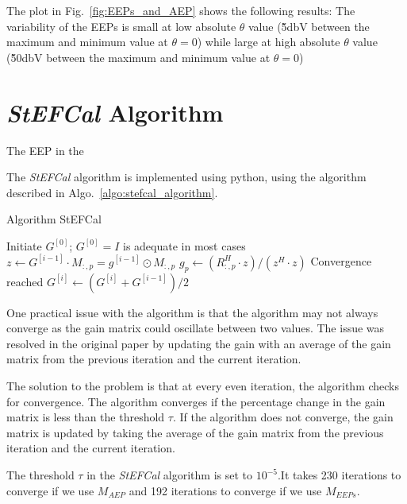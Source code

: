 \documentclass[10pt,a4paper,twocolumn]{paper}
\begin{document}
The plot in Fig.~\ref{fig:EEPs_and_AEP} shows the following results: The variability of the EEPs is small at low absolute $\theta$ value (\~5dbV between the maximum and minimum value at $\theta = 0$) while large at high absolute $\theta$ value (\~50dbV between the maximum and minimum value at $\theta = 0$)

\section{\textit{StEFCal} Algorithm}
The EEP in the 

The \textit{StEFCal} algorithm is implemented using python, using the algorithm described in Algo.~\ref{algo:stefcal_algorithm}. 

\begin{algorithm}
\caption{Algorithm StEFCal}
\begin{algorithmic}[1]
\State Initiate $G^{[0]}$; $G^{[0]} = I$ is adequate in most cases
        \State $z \leftarrow G^{[i-1]} \cdot M_{:,p} = g^{[i-1]} \odot M_{:,p}$
        \State $g_p \leftarrow (R_{:,p}^H \cdot z)/(z^H \cdot z)$
    \EndFor
            \State Convergence reached
        \Else
            \State $G^{[i]} \leftarrow (G^{[i]} + G^{[i-1]})/2$
        \EndIf
    \EndIf
\EndFor
\label{algo:stefcal_algorithm}
\end{algorithmic}
\end{algorithm}


One practical issue with the algorithm is that the algorithm may not always converge as the gain matrix could oscillate between two values. The issue was resolved in the original paper by updating the gain with an average of the gain matrix from the previous iteration and the current iteration.

The solution to the problem is that at every even iteration, the algorithm checks for convergence. The algorithm converges if the percentage change in the gain matrix is less than the threshold $\tau$. If the algorithm does not converge, the gain matrix is updated by taking the average of the gain matrix from the previous iteration and the current iteration. 

The threshold $\tau$ in the \textit{StEFCal} algorithm is set to $10^{-5}$.It takes 230 iterations to converge if we use $M_{AEP}$ and 192 iterations to converge if we use $M_{EEPs}$.
\end{document}
